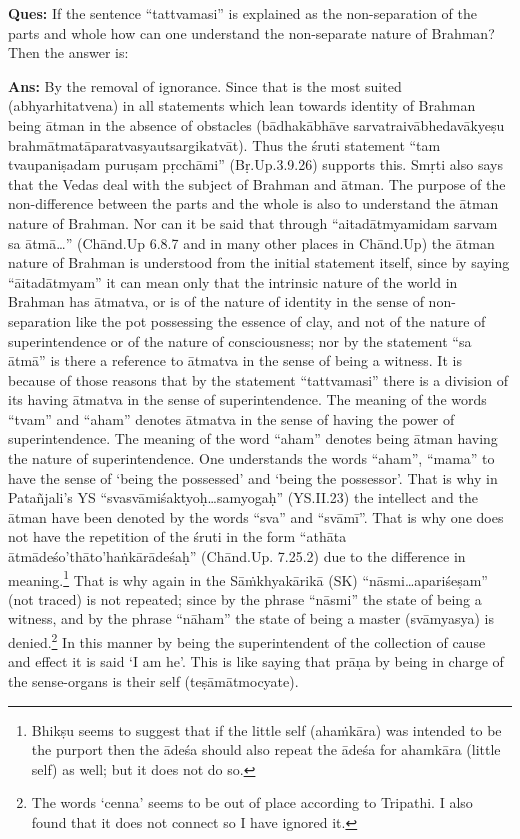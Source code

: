 \textbf{Ques:} If the sentence “tattvamasi” is explained as the non-separation of the parts and whole how can one understand the non-separate nature of Brahman? Then the answer is: 

\textbf{Ans:} By the removal of ignorance. Since that is the most suited (abhyarhitatvena) in all statements which lean towards identity of Brahman being ātman in the absence of obstacles (bādhakābhāve sarvatraivābhedavākyeṣu brahmātmatāparatvasyautsargikatvāt). Thus the śruti statement “tam tvaupaniṣadam puruṣam pṛcchāmi” (Bṛ.Up.3.9.26) supports this. Smṛti also says that the Vedas deal with the subject of Brahman and ātman. The purpose of the non-difference between the parts and the whole is also to understand the ātman nature of Brahman. Nor can it be said that through “aitadātmyamidam sarvam sa ātmā…” (Chānd.Up 6.8.7 and in many other places in Chānd.Up) the ātman nature of Brahman is understood from the initial statement itself, since by saying “āitadātmyam” it can mean only that the intrinsic nature of the world in Brahman has ātmatva, or is of the nature of identity in the sense of non-separation like the pot possessing the essence of clay, and not of the nature of superintendence or of the nature of consciousness; nor by the statement “sa ātmā” is there a reference to ātmatva in the sense of being a witness. It is because of those reasons that by the statement “tattvamasi” there is a division of its having ātmatva in the sense of superintendence. The meaning of the words “tvam” and “aham” denotes ātmatva in the sense of having the power of superintendence. The meaning of the word “aham” denotes being ātman having the nature of superintendence. One understands the words “aham”, “mama” to have the sense of ‘being the possessed’ and ‘being the possessor’. That is why in Patañjali’s YS “svasvāmiśaktyoḥ…samyogaḥ” (YS.II.23) the intellect and the ātman have been denoted by the words “sva” and “svāmī”. That is why one does not have the repetition of the śruti in the form “athāta ātmādeśo’thāto’haṅkārādeśaḥ” (Chānd.Up. 7.25.2) due to the difference in meaning.\footnote{Bhikṣu seems to suggest that if the little self (ahaṁkāra) was intended to be the purport then the ādeśa should also repeat the ādeśa for ahamkāra (little self) as well; but it does not do so.} That is why again in the Sāṁkhyakārikā (SK) “nāsmi…\-apariśeṣam” (not traced) is not repeated; since by the phrase “nāsmi” the state of being a witness, and by the phrase “nāham” the state of being a master (svāmyasya) is denied.\footnote{The words ‘cenna’ seems to be out of place according to Tripathi. I also found that it does not connect so I have ignored it.} In this manner by being the superintendent of the collection of cause and effect it is said ‘I am he’. This is like saying that prāṇa by being in charge of the sense-organs is their self (teṣāmātmocyate). 

